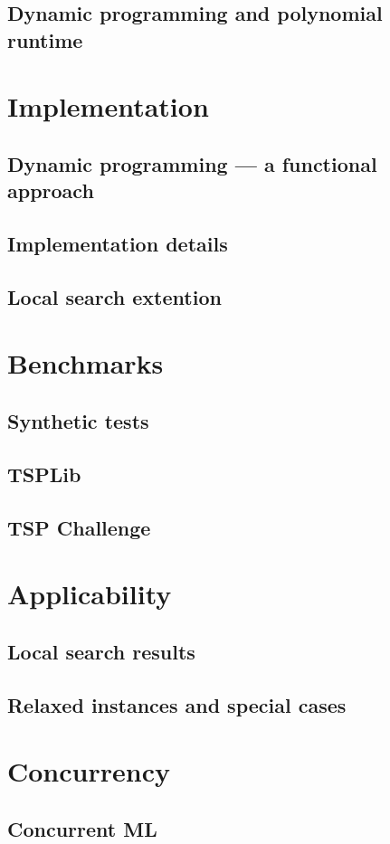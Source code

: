 \documentclass[10pt,a4paper]{scrartcl}
\begin{document}
\subsection{Dynamic programming and polynomial runtime}
\section{Implementation}
\subsection{Dynamic programming --- a functional approach}
\subsection{Implementation details}
\subsection{Local search extention}
\section{Benchmarks}
\subsection{Synthetic tests}
\subsection{TSPLib}
\subsection{TSP Challenge}
\section{Applicability}
\subsection{Local search results}
\subsection{Relaxed instances and special cases}
\section{Concurrency}
\subsection{Concurrent ML}
\end{document}
